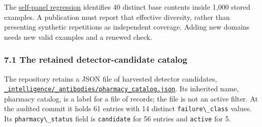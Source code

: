 \documentclass[
  11pt,
]{article}
\newcommand{\passthrough}[1]{#1}
\begin{document}
The
\href{https://github.com/dbccpage/the_symbol_game/blob/52cb5457f6c485ba548cfd292f6012a941ed22cf/omega_engine_symbol_game/tests/test_immune_defect_regressions.py}{self-panel
regression} identifies 40 distinct base contents inside 1,000 stored
examples. A publication must report that effective diversity, rather
than presenting synthetic repetitions as independent coverage. Adding
new domains needs new valid examples and a renewed check.

\subsubsection{7.1 The retained detector-candidate
catalog}\label{the-retained-detector-candidate-catalog}

The repository retains a JSON file of harvested detector candidates,
\href{https://github.com/dbccpage/the_symbol_game/blob/52cb5457f6c485ba548cfd292f6012a941ed22cf/_intelligence/_antibodies/pharmacy_catalog.json}{\nolinkurl{_intelligence/_antibodies/pharmacy_catalog.json}}.
Its inherited name, pharmacy catalog, is a label for a file of records;
the file is not an active filter. At the audited commit it holds 61
entries with 14 distinct \passthrough{\lstinline!failure\_class!}
values. Its \passthrough{\lstinline!pharmacy\_status!} field is
\passthrough{\lstinline!candidate!} for 56 entries and
\passthrough{\lstinline!active!} for 5.
\end{document}
